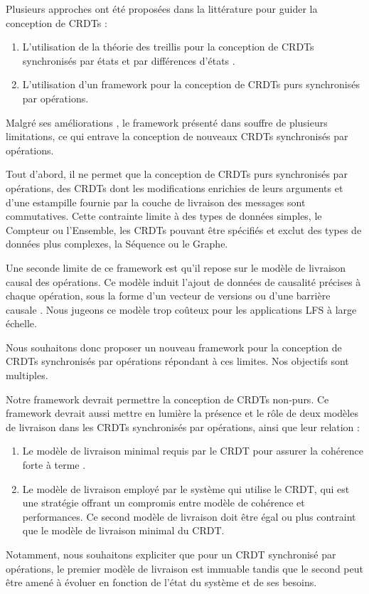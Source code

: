 Plusieurs approches ont été proposées dans la littérature pour guider la conception de \acp{CRDT} :
\begin{enumerate}
    \item L'utilisation de la théorie des treillis pour la conception de \acp{CRDT} synchronisés par états et par différences d'états \cite{shapiro_2011_crdt,enes2019}.
    \item L'utilisation d'un framework \cite{baquero2017pure} pour la conception de \acp{CRDT} purs synchronisés par opérations.
\end{enumerate}

Malgré ses améliorations \cite{2020-flec-bauwens,2021-improving-reactivity-pure-op-based-crdts-bauwens}, le framework présenté dans \cite{baquero2017pure} souffre de plusieurs limitations, ce qui entrave la conception de nouveaux \acp{CRDT} synchronisés par opérations.

Tout d'abord, il ne permet que la conception de \acp{CRDT} purs synchronisés par opérations, \ie des \acp{CRDT} dont les modifications enrichies de leurs arguments et d'une estampille fournie par la couche de livraison des messages sont commutatives.
Cette contrainte limite à des types de données simples, \eg le Compteur ou l'Ensemble, les \acp{CRDT} pouvant être spécifiés et exclut des types de données plus complexes, \eg la Séquence ou le Graphe.

Une seconde limite de ce framework est qu'il repose sur le modèle de livraison causal des opérations.
Ce modèle induit l'ajout de données de causalité précises à chaque opération, sous la forme d'un vecteur de versions \cite{1988-version-vector-mattern,1991-version-vector-fidge} ou d'une barrière causale \cite{1997-causal-barrier}.
Nous jugeons ce modèle trop coûteux pour les applications \ac{LFS} à large échelle.

Nous souhaitons donc proposer un nouveau framework pour la conception de \acp{CRDT} synchronisés par opérations répondant à ces limites.
Nos objectifs sont multiples.

Notre framework devrait permettre la conception de \acp{CRDT} non-purs.
Ce framework devrait aussi mettre en lumière la présence et le rôle de deux modèles de livraison dans les \acp{CRDT} synchronisés par opérations, ainsi que leur relation :
\begin{enumerate}
    \item Le modèle de livraison minimal requis par le \ac{CRDT} pour assurer la cohérence forte à terme \cite{shapiro_2011_crdt}.
    \item Le modèle de livraison employé par le système qui utilise le \ac{CRDT}, qui est une stratégie offrant un compromis entre modèle de cohérence et performances.
        Ce second modèle de livraison doit être égal ou plus contraint que le modèle de livraison minimal du \ac{CRDT}.
\end{enumerate}
Notamment, nous souhaitons expliciter que pour un \ac{CRDT} synchronisé par opérations, le premier modèle de livraison est immuable tandis que le second peut être amené à évoluer en fonction de l'état du système et de ses besoins.

